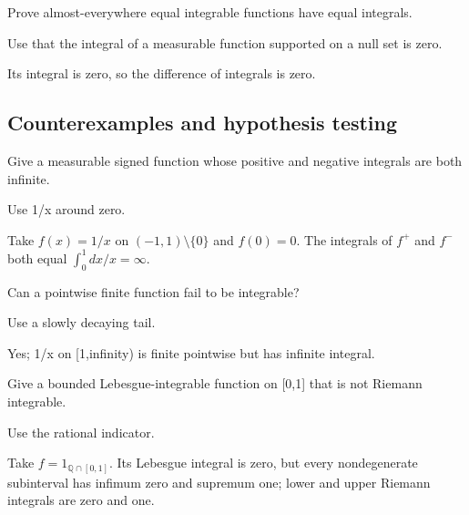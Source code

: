\begin{exercise}\label{exr:iii03-expand-09}
Prove almost-everywhere equal integrable functions have equal integrals.
\end{exercise}
\begin{hint}
Use that the integral of a measurable function supported on a null set is zero.
\end{hint}
\begin{solution}
Its integral is zero, so the difference of integrals is zero.
\end{solution}

\subsection*{Counterexamples and hypothesis testing}

\begin{exercise}\label{exr:iii03-expand-10}
Give a measurable signed function whose positive and negative integrals are both infinite.
\end{exercise}
\begin{hint}
Use 1/x around zero.
\end{hint}
\begin{solution}
Take $f(x)=1/x$ on $(-1,1)\setminus\{0\}$ and $f(0)=0$. The integrals of $f^+$ and $f^-$ both equal $\int_0^1 dx/x=\infty$.
\end{solution}

\begin{exercise}\label{exr:iii03-expand-11}
Can a pointwise finite function fail to be integrable?
\end{exercise}
\begin{hint}
Use a slowly decaying tail.
\end{hint}
\begin{solution}
Yes; 1/x on [1,infinity) is finite pointwise but has infinite integral.
\end{solution}

\begin{exercise}\label{exr:iii03-expand-12}
Give a bounded Lebesgue-integrable function on [0,1] that is not Riemann integrable.
\end{exercise}
\begin{hint}
Use the rational indicator.
\end{hint}
\begin{solution}
Take $f=1_{\mathbb Q\cap[0,1]}$. Its Lebesgue integral is zero, but every nondegenerate subinterval has infimum zero and supremum one; lower and upper Riemann integrals are zero and one.
\end{solution}


